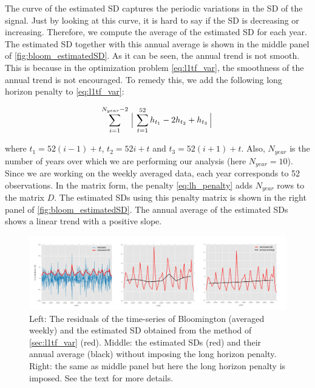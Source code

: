 \documentclass{article}
\begin{document}
The curve of the estimated SD captures the periodic variations in the
SD of the signal. Just by looking at this curve, it is hard to say if
the SD is decreasing or increasing. Therefore, we compute the average
of the estimated SD for each year. The estimated SD together with this
annual average is shown in the middle panel of
\autoref{fig:bloom_estimatedSD}. As it can be seen, the annual trend
is not smooth. This is because in the optimization problem
\eqref{eq:l1tf_var}, the smoothness of the annual trend is not
encouraged. To remedy this, we add the following long horizon penalty
to \eqref{eq:l1tf_var}:
 
\begin{equation}
\sum_{i=1}^{N_{year}-2} \Big\arrowvert \sum_{t=1}^{52} h_{t_1}-2h_{t_2}+h_{t_3}  \Big\arrowvert
\label{eq:lh_penalty}
\end{equation}

where $t_1=52(i-1)+t$, $t_2=52i+t$ and $t_3=52(i+1)+t$. Also, $N_{year}$ is the number of years over which we are performing our analysis (here $N_{year}=10$). Since we are working on the weekly averaged data, each year corresponds to 52 observations. In the matrix form, the penalty \eqref{eq:lh_penalty} adds $N_{year}$ rows to the matrix $D$. The estimated SDs using this penalty matrix is shown in the right panel of \autoref{fig:bloom_estimatedSD}. The annual average of the estimated SDs shows a linear trend with a positive slope. 

\begin{figure}[tb]
  \centering
  \includegraphics[width=\columnwidth]{Figures/bloom_estimatedSD}
  \caption{Left: The residuals of the time-series of Bloomington
    (averaged weekly) and the estimated SD obtained from the method of
    \autoref{sec:l1tf_var} (red). Middle: the estimated SDs (red) and
    their annual average (black) without imposing the long horizon
    penalty. Right: the same as middle panel but here the long horizon
    penalty is imposed. See the text for more details.} 
  \label{fig:bloom_estimatedSD}
\end{figure} 

\end{document}
